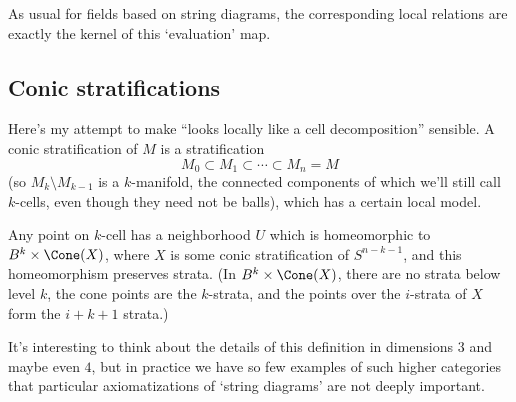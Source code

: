 \documentclass[11pt]{amsart}
\theoremstyle{plain}
\begin{document}
As usual for fields based on string diagrams, the corresponding local relations are exactly the kernel of this `evaluation' map.

\subsection{Conic stratifications}
Here's my attempt to make ``looks locally like a cell decomposition'' sensible. A conic stratification of $M$ is a stratification $$M_0 \subset M_1 \subset \cdots \subset M_n = M$$
(so $M_k \setminus M_{k-1}$ is a $k$-manifold, the connected components of which we'll still call $k$-cells, even though they need not be balls), which has a certain local model.

Any point on $k$-cell has a neighborhood $U$ which is homeomorphic to $B^k \times \Cone(X)$, where $X$ is some conic stratification of $S^{n-k-1}$, and this homeomorphism preserves strata. (In $B^k \times \Cone(X)$, there are no strata below level $k$, the cone points are the $k$-strata, and the points over the $i$-strata of $X$ form the $i+k+1$ strata.)

It's interesting to think about the details of this definition in dimensions $3$ and maybe even $4$, but in practice we have so few examples of such higher categories that particular axiomatizations of `string diagrams' are not deeply important.
\end{document}
